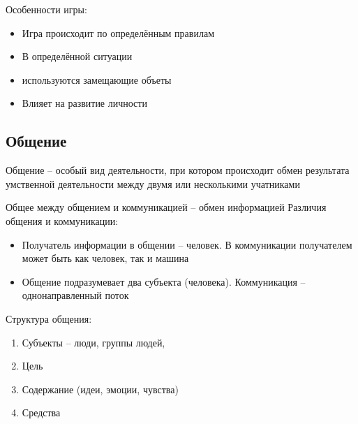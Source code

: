 \documentclass[12pt,a4paper]{book}
\begin{document}
Особенности игры:
\begin{itemize}
	\item Игра происходит по определённым правилам
	\item В определённой ситуации
	\item используются замещающие объеты
	\item Влияет на развитие личности
\end{itemize}

\subsection{Общение}
Общение -- особый вид деятельности, при котором происходит обмен результата умственной деятельности между двумя или несколькими учатниками

Общее между общением и коммуникацией -- обмен информацией
Различия общения и коммуникации:
\begin{itemize}
	\item Получатель информации в общении -- человек. В коммуникации получателем может быть как человек, так и машина
	\item Общение подразумевает два субъекта (человека). Коммуникация -- однонаправленный поток
\end{itemize}

Структура общения:
\begin{enumerate}
	\item Субъекты -- люди, группы людей, 
	\item Цель 
	\item Содержание (идеи, эмоции, чувства)
	\item Средства
\end{enumerate}
\end{document}
